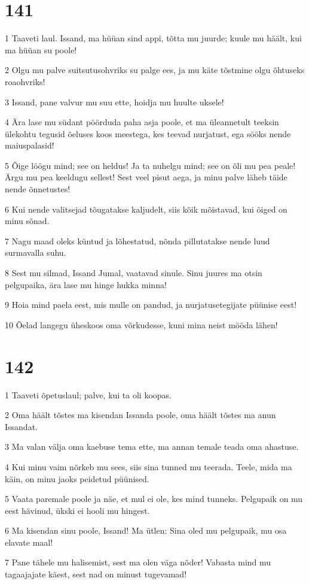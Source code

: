 \chapter{141}

\par 1 Taaveti laul. Issand, ma hüüan sind appi, tõtta mu juurde; kuule mu häält, kui ma hüüan su poole!
\par 2 Olgu mu palve suitsutusohvriks su palge ees, ja mu käte tõstmine olgu õhtuseks roaohvriks!
\par 3 Issand, pane valvur mu suu ette, hoidja mu huulte uksele!
\par 4 Ära lase mu südant pöörduda paha asja poole, et ma üleannetult teeksin ülekohtu tegusid õeluses koos meestega, kes teevad nurjatust, ega sööks nende maiuspalasid!
\par 5 Õige löögu mind; see on heldus! Ja ta nuhelgu mind; see on õli mu pea peale! Ärgu mu pea keeldugu sellest! Sest veel pisut aega, ja minu palve läheb täide nende õnnetustes!
\par 6 Kui nende valitsejad tõugatakse kaljudelt, siis kõik mõistavad, kui õiged on minu sõnad.
\par 7 Nagu maad oleks küntud ja lõhestatud, nõnda pillutatakse nende luud surmavalla suhu.
\par 8 Sest mu silmad, Issand Jumal, vaatavad sinule. Sinu juures ma otsin pelgupaika, ära lase mu hinge hukka minna!
\par 9 Hoia mind paela eest, mis mulle on pandud, ja nurjatusetegijate püünise eest!
\par 10 Õelad langegu üheskoos oma võrkudesse, kuni mina neist mööda lähen!

\chapter{142}

\par 1 Taaveti õpetuslaul; palve, kui ta oli koopas.
\par 2 Oma häält tõstes ma kisendan Issanda poole, oma häält tõstes ma anun Issandat.
\par 3 Ma valan välja oma kaebuse tema ette, ma annan temale teada oma ahastuse.
\par 4 Kui minu vaim nõrkeb mu sees, siis sina tunned mu teerada. Teele, mida ma käin, on minu jaoks peidetud püünised.
\par 5 Vaata paremale poole ja näe, et mul ei ole, kes mind tunneks. Pelgupaik on mu eest hävinud, ükski ei hooli mu hingest.
\par 6 Ma kisendan sinu poole, Issand! Ma ütlen: Sina oled mu pelgupaik, mu osa elavate maal!
\par 7 Pane tähele mu halisemist, sest ma olen väga nõder! Vabasta mind mu tagaajajate käest, sest nad on minust tugevamad!

